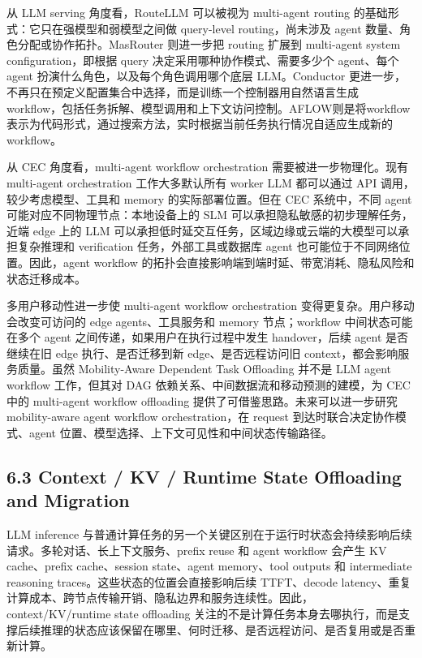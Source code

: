 \documentclass[a4paper,10pt]{ctexart}
\begin{document}
从 LLM serving 角度看，RouteLLM 可以被视为 multi-agent routing 的基础形式：它只在强模型和弱模型之间做 query-level routing，尚未涉及 agent 数量、角色分配或协作拓扑。MasRouter 则进一步把 routing 扩展到 multi-agent system configuration，即根据 query 决定采用哪种协作模式、需要多少个 agent、每个 agent 扮演什么角色，以及每个角色调用哪个底层 LLM。Conductor 更进一步，不再只在预定义配置集合中选择，而是训练一个控制器用自然语言生成 workflow，包括任务拆解、模型调用和上下文访问控制。AFLOW则是将workflow表示为代码形式，通过搜索方法，实时根据当前任务执行情况自适应生成新的workflow。


从 CEC 角度看，multi-agent workflow orchestration 需要被进一步物理化。现有 multi-agent orchestration 工作大多默认所有 worker LLM 都可以通过 API 调用，较少考虑模型、工具和 memory 的实际部署位置。但在 CEC 系统中，不同 agent 可能对应不同物理节点：本地设备上的 SLM 可以承担隐私敏感的初步理解任务，近端 edge 上的 LLM 可以承担低时延交互任务，区域边缘或云端的大模型可以承担复杂推理和 verification 任务，外部工具或数据库 agent 也可能位于不同网络位置。因此，agent workflow 的拓扑会直接影响端到端时延、带宽消耗、隐私风险和状态迁移成本。


多用户移动性进一步使 multi-agent workflow orchestration 变得更复杂。用户移动会改变可访问的 edge agents、工具服务和 memory 节点；workflow 中间状态可能在多个 agent 之间传递，如果用户在执行过程中发生 handover，后续 agent 是否继续在旧 edge 执行、是否迁移到新 edge、是否远程访问旧 context，都会影响服务质量。虽然 Mobility-Aware Dependent Task Offloading 并不是 LLM agent workflow 工作，但其对 DAG 依赖关系、中间数据流和移动预测的建模，为 CEC 中的 multi-agent workflow offloading 提供了可借鉴思路。未来可以进一步研究 mobility-aware agent workflow orchestration，在 request 到达时联合决定协作模式、agent 位置、模型选择、上下文可见性和中间状态传输路径。




\subsection*{6.3 Context / KV / Runtime State Offloading and Migration}

LLM inference 与普通计算任务的另一个关键区别在于运行时状态会持续影响后续请求。多轮对话、长上下文服务、prefix reuse 和 agent workflow 会产生 KV cache、prefix cache、session state、agent memory、tool outputs 和 intermediate reasoning traces。这些状态的位置会直接影响后续 TTFT、decode latency、重复计算成本、跨节点传输开销、隐私边界和服务连续性。因此，context/KV/runtime state offloading 关注的不是计算任务本身去哪执行，而是支撑后续推理的状态应该保留在哪里、何时迁移、是否远程访问、是否复用或是否重新计算。
\end{document}
